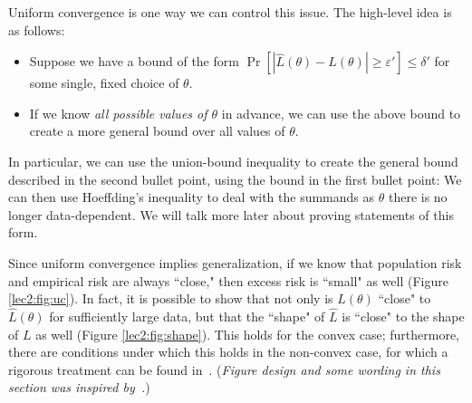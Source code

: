 
Uniform convergence is one way we can control this issue. The high-level idea is as follows: 
\begin{itemize}
    \item Suppose we have a bound of the form $\Pr[|\hat{L}(\theta) - L(\theta)| \geq \varepsilon'] \leq \delta'$ for some single, fixed choice of $\theta$.
    \item If we know \emph{all possible values of $\theta$} in advance, we can use the above bound to create a more general bound over all values of $\theta$.
\end{itemize}
In particular, we can use the union-bound inequality to create the general bound described in the second bullet point, using the bound in the first bullet point:
We can then use Hoeffding's inequality to deal with the summands as $\theta$ there is no longer data-dependent. We will talk more later about proving statements of this form.


Since uniform convergence implies generalization, if we know that population risk and empirical risk are always ``close," then excess risk is ``small" as well (Figure \ref{lec2:fig:uc}). In fact, it is possible to show that not only is $L(\theta)$ ``close" to $\hat{L}(\theta)$ for sufficiently large data, but that the ``shape" of $\hat{L}$ is ``close" to the shape of $L$ as well (Figure \ref{lec2:fig:shape}). This holds for the convex case; furthermore, there are conditions under which this holds in the non-convex case, for which a rigorous treatment can be found in~\cite{mei2017landscape}. (\emph{Figure design and some wording in this section was inspired by~\cite{percynotes, thomasliu2018}.})

